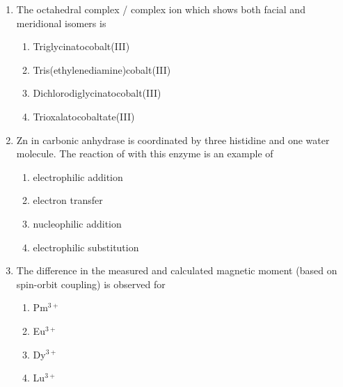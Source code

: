 \documentclass[journal,12pt,onecolumn]{IEEEtran}
\theoremstyle{remark}
\begin{document}
\begin{enumerate}
\begin{multicols}{4}
\begin{enumerate}
     \item   Zn
     \item   Cu
     \item   Mn
     \item   Fe
\end{enumerate}
\end{multicols}
 

\item The octahedral complex / complex ion which shows both facial and meridional isomers is \hfill{}
\begin{multicols}{2}
    
\begin{enumerate}
     \item   Triglycinatocobalt(III)
     \item   Tris(ethylenediamine)cobalt(III)
     \item   Dichlorodiglycinatocobalt(III)
     \item   Trioxalatocobaltate(III)
\end{enumerate}
\end{multicols}
 

\item Zn in carbonic anhydrase is coordinated by three histidine and one water molecule. The reaction of  with this enzyme is an example of \hfill{}
\begin{multicols}{4}
    

\begin{enumerate}
     \item   electrophilic addition
     \item   electron transfer
     \item   nucleophilic addition
     \item   electrophilic substitution
\end{enumerate}

\end{multicols}
 

\item The difference in the measured and calculated magnetic moment (based on spin-orbit coupling) is observed for \hfill{}
\begin{multicols}{2}
\begin{enumerate}[leftmargin=*,labelsep=1em]
     \item   Pm$^{3+}$
     \item   Eu$^{3+}$
     \item   Dy$^{3+}$
     \item   Lu$^{3+}$
\end{enumerate}
\end{multicols}
  


\end{enumerate}
\end{document}
